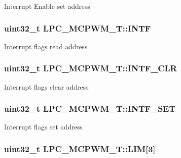 Interrupt Enable set address \hypertarget{structLPC__MCPWM__T_a0bfcbbed2fabcf16419d014ff01e8e37}{
\subsubsection[{I\-N\-T\-F}]{ uint32\-\_\-t L\-P\-C\-\_\-\-M\-C\-P\-W\-M\-\_\-\-T\-::\-I\-N\-T\-F}}\label{structLPC__MCPWM__T_a0bfcbbed2fabcf16419d014ff01e8e37}
Interrupt flags read address \hypertarget{structLPC__MCPWM__T_acd49890931c9446a54e8070478cf7185}{
\subsubsection[{I\-N\-T\-F\-\_\-\-C\-L\-R}]{ uint32\-\_\-t L\-P\-C\-\_\-\-M\-C\-P\-W\-M\-\_\-\-T\-::\-I\-N\-T\-F\-\_\-\-C\-L\-R}}\label{structLPC__MCPWM__T_acd49890931c9446a54e8070478cf7185}
Interrupt flags clear address \hypertarget{structLPC__MCPWM__T_a4c129a22156572b5671ff0e8b9f1977d}{
\subsubsection[{I\-N\-T\-F\-\_\-\-S\-E\-T}]{ uint32\-\_\-t L\-P\-C\-\_\-\-M\-C\-P\-W\-M\-\_\-\-T\-::\-I\-N\-T\-F\-\_\-\-S\-E\-T}}\label{structLPC__MCPWM__T_a4c129a22156572b5671ff0e8b9f1977d}
Interrupt flags set address \hypertarget{structLPC__MCPWM__T_a01c2889381949b5b1f8c2bf8edf9148c}{
\subsubsection[{L\-I\-M}]{ uint32\-\_\-t L\-P\-C\-\_\-\-M\-C\-P\-W\-M\-\_\-\-T\-::\-L\-I\-M\mbox{[}3\mbox{]}}}\label{structLPC__MCPWM__T_a01c2889381949b5b1f8c2bf8edf9148c}
